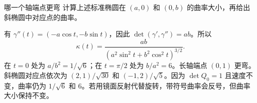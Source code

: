 \begin{example}{哪一个轴端点更弯}
计算上述标准椭圆在 $(a,0)$ 和 $(0,b)$ 的曲率大小，再给出斜椭圆中对应点的曲率。
\end{example}
\begin{solution}
有 $\gamma''(t)=(-a\cos t,-b\sin t)$，因此 $\det(\gamma',\gamma'')=ab$。所以
\[
\kappa(t)=\frac{ab}{(a^2\sin^2t+b^2\cos^2t)^{3/2}}.
\]
在 $t=0$ 处为 $a/b^2=1/\sqrt6$；在 $t=\pi/2$ 处为 $b/a^2=6$。长轴端点 $(0,1)$ 更弯。斜椭圆对应点依次为 $(2,1)/\sqrt{30}$ 和 $(-1,2)/\sqrt5$。因为 $\det Q_0=1$ 且速度不变，曲率仍为 $1/\sqrt6$ 和 $6$。若用镜面反射代替旋转，带符号曲率会反号，但曲率大小保持不变。
\end{solution}
